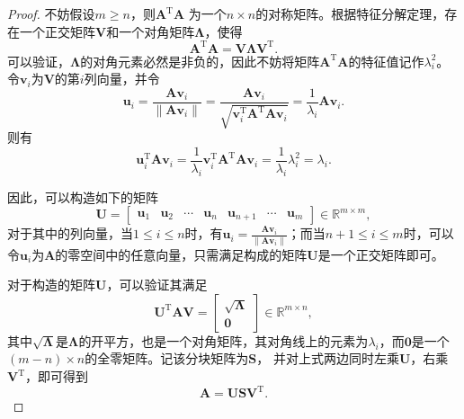 \begin{proof}
    不妨假设\( m \geq n \)，则\( \mathbf{A}^{\mathrm{T}} \mathbf{A} \) 为一个\( n \times n \)的对称矩阵。根据特征分解定理，存在一个正交矩阵\( \mathbf{V} \)和一个对角矩阵\( \mathbf{\Lambda} \)，使得
    \[
        \mathbf{A}^{\mathrm{T}} \mathbf{A} = \mathbf{V} \mathbf{\Lambda} \mathbf{V}^{\mathrm{T}}.
    \]
    可以验证，\( \mathbf{\Lambda} \)的对角元素必然是非负的，因此不妨将矩阵\( \mathbf{A}^{\mathrm{T}} \mathbf{A} \)的特征值记作\( \lambda_i^2 \)。令\( \bm{v}_i \)为\( \mathbf{V} \)的第\( i \)列向量，并令
    \[
        \bm{u}_i = \frac{\mathbf{A} \bm{v}_i}{\|\mathbf{A} \bm{v}_i\|} = \frac{\mathbf{A} \bm{v}_i}{\sqrt{\bm{v}_i^{\mathrm{T}} \mathbf{A}^{\mathrm{T}} \mathbf{A} \bm{v}_i}} = \frac{1}{\lambda_i} \mathbf{A} \bm{v}_i.
    \]
    则有
    \[
        \bm{u}_i^{\mathrm{T}} \mathbf{A} \bm{v}_i = \frac{1}{\lambda_i} \bm{v}_i^{\mathrm{T}} \mathbf{A}^{\mathrm{T}} \mathbf{A} \bm{v}_i = \frac{1}{\lambda_i} \lambda_i^2 = \lambda_i.
    \]

    因此，可以构造如下的矩阵
    \[
        \mathbf{U} =
        \begin{bmatrix}
            \bm{u}_1 & \bm{u}_2 & \cdots & \bm{u}_n & \bm{u}_{n+1} & \cdots & \bm{u}_m
        \end{bmatrix} \in \mathbb{R}^{m \times m},
    \]
    对于其中的列向量，当\( 1 \leq i \leq n \)时，有\( \bm{u}_i = \frac{\mathbf{A} \bm{v}_i}{\|\mathbf{A} \bm{v}_i\|} \)；而当\( n + 1 \leq i \leq m \)时，可以令\( \bm{u}_i \)为\( \mathbf{A} \)的零空间中的任意向量，只需满足构成的矩阵\( \mathbf{U} \)是一个正交矩阵即可。

    对于构造的矩阵\( \mathbf{U} \)，可以验证其满足
    \[
        \mathbf{U}^{\mathrm{T}} \mathbf{A} \mathbf{V} =
        \begin{bmatrix}
            \sqrt{\mathbf{\Lambda}} \\
            \mathbf{0}
        \end{bmatrix} \in \mathbb{R}^{m \times n},
    \]
    其中\( \sqrt{\mathbf{\Lambda}} \)是\( \mathbf{\Lambda} \)的开平方，也是一个对角矩阵，其对角线上的元素为\( \lambda_i \)，而\( \mathbf{0} \)是一个\( (m - n) \times n \)的全零矩阵。记该分块矩阵为\( \mathbf{S} \)， 并对上式两边同时左乘\( \mathbf{U} \)，右乘\( \mathbf{V}^{\mathrm{T}} \)，即可得到
    \[
        \mathbf{A} = \mathbf{U} \mathbf{S} \mathbf{V}^{\mathrm{T}}.
    \]
\end{proof}

